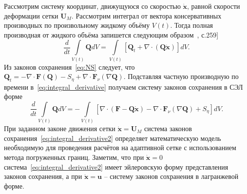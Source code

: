Рассмотрим систему координат, движущуюся со скоростью $\dot{\mathbf{x}}$, равной скорости деформации сетки $\mathbf{U}_M$. Рассмотрим интеграл от вектора консервативных производных по произвольному жидкому объёму $V(t)$. Тогда полная производная от жидкого объёма запишется следующим образом~\cite{budak2002}, с.259]
\begin{equation}\label{eq:integral_derivative}
\frac{d}{dt}\int \limits_{V(t)}\mathbf{Q}dV = \int \limits_{V(t)}\left[\mathbf{Q}_t + \nabla \cdot (\mathbf{Q}\dot{\mathbf{x}})\right]dV .
\end{equation}
Из законов сохранения~\eqref{eq:NS} следует, что $\mathbf{Q}_t = -\nabla \cdot \mathbf{F}(\mathbf{Q})-S_{\eta} + \nabla\cdot\mathbf{F}_{\nu}(\nabla \mathbf{Q})$. Подставляя частную производную по времени в~\eqref{eq:integral_derivative} получаем систему законов сохранения в СЭЛ форме
\begin{equation}\label{eq:integral_derivative2}
\frac{d}{dt}\int \limits_{V(t)}\mathbf{Q}dV = 
-\int \limits_{V(t)}\left[ \nabla \cdot(\mathbf{F} - \mathbf{Q}\dot{\mathbf{x}}) - \nabla\cdot\mathbf{F}_{\nu}(\nabla \mathbf{Q}) + S_{\eta} \right] dV .
\end{equation}
При заданном законе движения сетки  $\dot{\mathbf{x}} = \mathbf{U}_M$ система законов сохранения~\eqref{eq:integral_derivative2} определяет математическую модель необходимую для проведения расчётов на адаптивной сетке с использованием метода погруженных границ. Заметим, что при  $\dot{\mathbf{x}} = 0$ система~\eqref{eq:integral_derivative2} имеет эйлеровскую форму представления законов сохранения, а при $\dot{\mathbf{x}} = \mathbf{u}$  – систему законов сохранения в лагранжевой форме.
